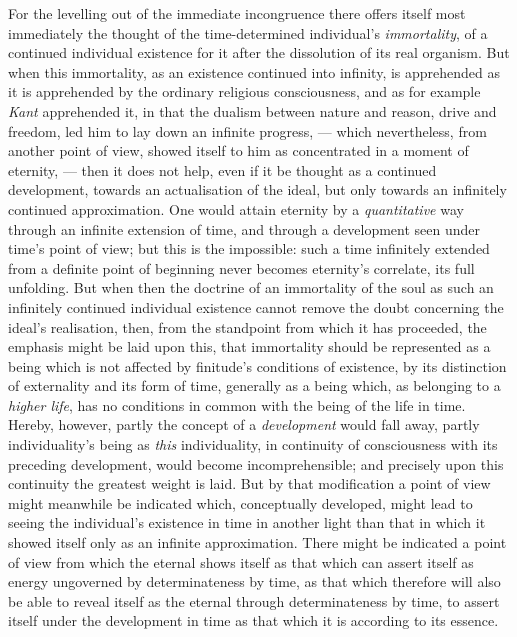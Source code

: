 \documentclass[12pt,a4paper]{book}
\begin{document}
For the levelling out of the immediate incongruence there offers itself most
immediately the thought of the time-determined individual's \emph{immortality},
of a continued individual existence for it after the dissolution of its real
organism. But when this immortality, as an existence continued into infinity, is
apprehended as it is apprehended by the ordinary religious consciousness, and as
for example \emph{Kant} apprehended it, in that the dualism between nature and
reason, drive and freedom, led him to lay down an infinite progress, --- which
nevertheless, from another point of view, showed itself to him as concentrated
in a moment of eternity, --- then it does not help, even if it be thought as a
continued development, towards an actualisation of the ideal, but only towards
an infinitely continued approximation. One would attain eternity by a
\emph{quantitative} way through an infinite extension of time, and through a
development seen under time's point of view; but this is the impossible: such a
time infinitely extended from a definite point of beginning never becomes
eternity's correlate, its full unfolding. But when then the doctrine of an
immortality of the soul as such an infinitely continued individual existence
cannot remove the doubt concerning the ideal's realisation, then, from the
standpoint from which it has proceeded, the emphasis might be laid upon this,
that immortality should be represented as a being which is not affected by
finitude's conditions of existence, by its distinction of externality and its
form of time, generally as a being which, as belonging to a \emph{higher life},
has no conditions in common with the being of the life in time. Hereby, however,
partly the concept of a \emph{development} would fall away, partly
individuality's being as \emph{this} individuality, in continuity of
consciousness with its preceding development, would become incomprehensible; and
precisely upon this continuity the greatest weight is laid. But by that
modification a point of view might meanwhile be indicated which, conceptually
developed, might lead to seeing the individual's existence in time in another
light than that in which it showed itself only as an infinite approximation.
There might be indicated a point of view from which the eternal shows itself as
that which can assert itself as energy ungoverned by determinateness by time, as
that which therefore will also be able to reveal itself as the eternal through
determinateness by time, to assert itself under the development in time as that
which it is according to its essence.
\end{document}
